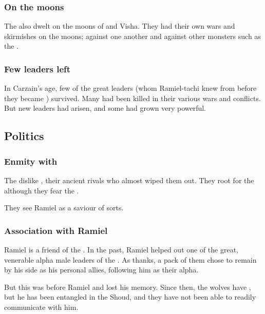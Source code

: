 \subsubsection{On the moons}
The \vorcanths also dwelt on the moons of \Dun and Visha. 
They had their own wars and skirmishes on the moons; against one another and against other monsters such as the . 





\subsubsection{Few leaders left}
In Carzain's age, few of the great \vorcanth{} leaders (whom Ramiel-tachi knew from before they became \malachim) survived. 
Many had been killed in their various wars and conflicts. 
But new leaders had arisen, and some had grown very powerful. 









\subsection{Politics}
\subsubsection{Enmity with \dragons}
The \moonwolves{} dislike \dragons, their ancient rivals who almost wiped them out. They root for the \resphain\dash although they fear the \banes. 

They see Ramiel as a saviour of sorts.





\subsubsection{Association with Ramiel}
Ramiel is a friend of the \MoonWolves{}. In the past, Ramiel helped out one of the great, venerable alpha male leaders of the \moonwolves. As thanks, a pack of them chose to remain by his side as his personal allies, following him as their alpha.

But this was before Ramiel  and lost his memory. Since then, the wolves have , but he has been entangled in the Shoud, and they have not been able to readily communicate with him. 

